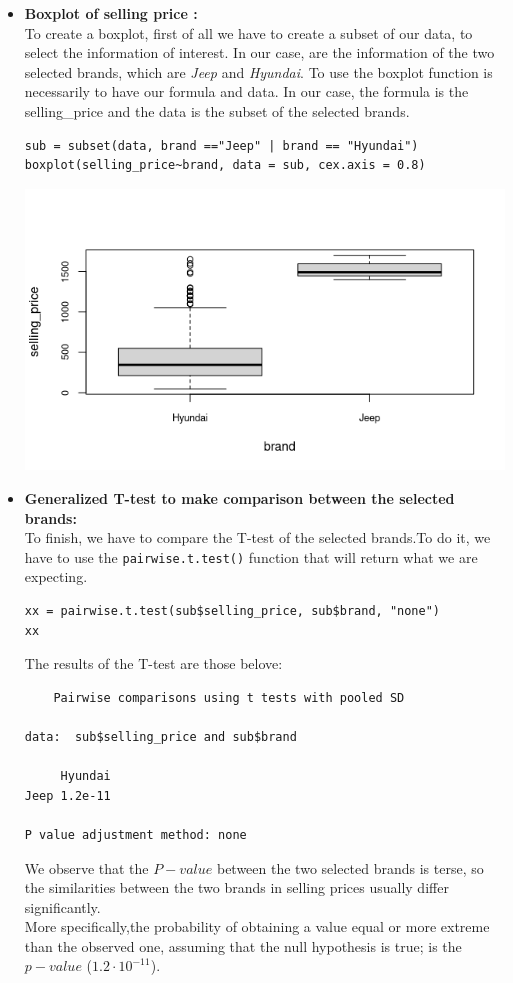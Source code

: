 \documentclass{article}
\begin{document}
\begin{itemize}
    \item\textbf{Boxplot of selling price :}\\
    To create a boxplot, first of all we have to create a subset of our data, to select the information of interest. In our case, are the information of the two selected brands, which are \textit{Jeep} and \textit{Hyundai}. To use the boxplot function is necessarily to have our formula and data.
    In our case, the formula is the selling\_price and the data is the subset of the selected brands.
    \begin{verbatim}
sub = subset(data, brand =="Jeep" | brand == "Hyundai")
boxplot(selling_price~brand, data = sub, cex.axis = 0.8)
    \end{verbatim}
    \includegraphics[width=1\textwidth]{unknown.png}
    \item\textbf{Generalized T-test to make comparison between the selected brands:}\\
    To finish, we have to compare the T-test of the selected brands.To do it, we have to use the \texttt{pairwise.t.test()} function that will return what we are expecting. 
    \begin{verbatim}
xx = pairwise.t.test(sub$selling_price, sub$brand, "none")
xx
    \end{verbatim}
The results of the T-test are those belove:
    \begin{verbatim}
    Pairwise comparisons using t tests with pooled SD 

data:  sub$selling_price and sub$brand 

     Hyundai
Jeep 1.2e-11

P value adjustment method: none
    \end{verbatim}
We observe that the $P-value$ between the two selected brands is terse, so the similarities between the two brands in selling prices usually differ significantly.  \\
More specifically,the probability of obtaining a value equal or more extreme than the observed one, assuming that the null hypothesis is true; is the $p-value$ ($1.2\cdot 10^{-11}$).
\end{itemize}
\end{document}
